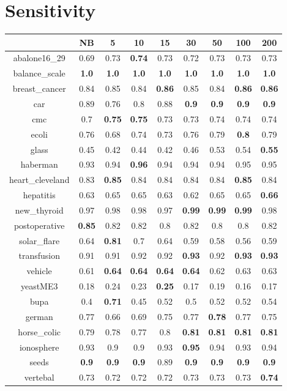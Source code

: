 \documentclass{article}%
\begin{document}
%
\section*{Sensitivity}%
\begin{tabular}{c|cccccccc}%
\hline%
&NB&5&10&15&30&50&100&200\\%
\hline%
abalone16\_29&0.69&0.73&\textbf{0.74}&0.73&0.72&0.73&0.73&0.73\\%
\hline%
balance\_scale&\textbf{1.0}&\textbf{1.0}&\textbf{1.0}&\textbf{1.0}&\textbf{1.0}&\textbf{1.0}&\textbf{1.0}&\textbf{1.0}\\%
\hline%
breast\_cancer&0.84&0.85&0.84&\textbf{0.86}&0.85&0.84&\textbf{0.86}&\textbf{0.86}\\%
\hline%
car&0.89&0.76&0.8&0.88&\textbf{0.9}&\textbf{0.9}&\textbf{0.9}&\textbf{0.9}\\%
\hline%
cmc&0.7&\textbf{0.75}&\textbf{0.75}&0.73&0.73&0.74&0.74&0.74\\%
\hline%
ecoli&0.76&0.68&0.74&0.73&0.76&0.79&\textbf{0.8}&0.79\\%
\hline%
glass&0.45&0.42&0.44&0.42&0.46&0.53&0.54&\textbf{0.55}\\%
\hline%
haberman&0.93&0.94&\textbf{0.96}&0.94&0.94&0.94&0.95&0.95\\%
\hline%
heart\_cleveland&0.83&\textbf{0.85}&0.84&0.84&0.84&0.84&\textbf{0.85}&0.84\\%
\hline%
hepatitis&0.63&0.65&0.65&0.63&0.62&0.65&0.65&\textbf{0.66}\\%
\hline%
new\_thyroid&0.97&0.98&0.98&0.97&\textbf{0.99}&\textbf{0.99}&\textbf{0.99}&0.98\\%
\hline%
postoperative&\textbf{0.85}&0.82&0.82&0.8&0.82&0.8&0.8&0.82\\%
\hline%
solar\_flare&0.64&\textbf{0.81}&0.7&0.64&0.59&0.58&0.56&0.59\\%
\hline%
transfusion&0.91&0.91&0.92&0.92&\textbf{0.93}&0.92&\textbf{0.93}&\textbf{0.93}\\%
\hline%
vehicle&0.61&\textbf{0.64}&\textbf{0.64}&\textbf{0.64}&\textbf{0.64}&0.62&0.63&0.63\\%
\hline%
yeastME3&0.18&0.24&0.23&\textbf{0.25}&0.17&0.19&0.16&0.17\\%
\hline%
bupa&0.4&\textbf{0.71}&0.45&0.52&0.5&0.52&0.52&0.54\\%
\hline%
german&0.77&0.66&0.69&0.75&0.77&\textbf{0.78}&0.77&0.75\\%
\hline%
horse\_colic&0.79&0.78&0.77&0.8&\textbf{0.81}&\textbf{0.81}&\textbf{0.81}&\textbf{0.81}\\%
\hline%
ionosphere&0.93&0.9&0.9&0.93&\textbf{0.95}&0.94&0.93&0.94\\%
\hline%
seeds&\textbf{0.9}&\textbf{0.9}&\textbf{0.9}&0.89&\textbf{0.9}&\textbf{0.9}&\textbf{0.9}&\textbf{0.9}\\%
\hline%
vertebal&0.73&0.72&0.72&0.72&0.73&0.73&0.73&\textbf{0.74}\\%
\hline%
\end{tabular}
\end{document}
